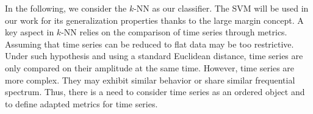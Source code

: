 In the following, we consider the $k$-NN as our classifier. The SVM will be used in our work for its generalization properties thanks to the large margin concept. A key aspect in $k$-NN relies on the comparison of time series through metrics. Assuming that time series can be reduced to flat data may be too restrictive. Under such hypothesis and using a standard Euclidean distance, time series are only compared on their amplitude at the same time. However, time series are more complex. They may exhibit similar behavior or share similar frequential spectrum. Thus, there is a need to consider time series as an ordered object and to define adapted metrics for time series.


